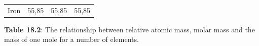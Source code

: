{\begin{center}
\begin{xtabular*}{\mytablewidth}[t]{|p{10\mystarwidth}|p{10\mystarwidth}|p{10\mystarwidth}|p{10\mystarwidth}|}
    
        Iron &
    
    
        55,85 &
    
    
        55,85 &
    
    
        55,85%
     \tabularnewline{}
    \end{xtabular*}
      \end{center}
    \begin{center}{\small\bfseries Table 18.2}: The relationship between relative atomic mass, molar mass and the mass of one mole for a number of elements.\end{center}
    
    \addtocounter{footnote}{-0}
    
        }%
      
    \par
  
\par
            \label{m38717*secfhsst!!!underscore!!!id209}\vspace{.5cm} 
      
